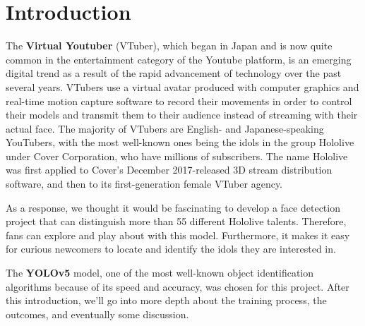 \label{Chapter Introduction}
\section{Introduction}
    The \textbf{Virtual Youtuber} (VTuber), which began in Japan and is now quite common in the entertainment category of the Youtube platform, is an emerging digital trend as a result of the rapid advancement of technology over the past several years.
    VTubers use a virtual avatar produced with computer graphics and real-time motion capture software to record their movements in order to control their models and transmit them to their audience instead of streaming with their actual face.
    The majority of VTubers are English- and Japanese-speaking YouTubers, with the most well-known ones being the idols in the group Hololive under Cover Corporation, who have millions of subscribers.
    The name Hololive was first applied to Cover's December 2017-released 3D stream distribution software, and then to its first-generation female VTuber agency. 
    
    As a response, we thought it would be fascinating to develop a face detection project that can distinguish more than 55 different Hololive talents.
    Therefore, fans can explore and play about with this model.
    Furthermore, it makes it easy for curious newcomers to locate and identify the idols they are interested in.
    
    The \textbf{YOLOv5} model, one of the most well-known object identification algorithms because of its speed and accuracy, was chosen for this project.
    After this introduction, we'll go into more depth about the training process, the outcomes, and eventually some discussion.
